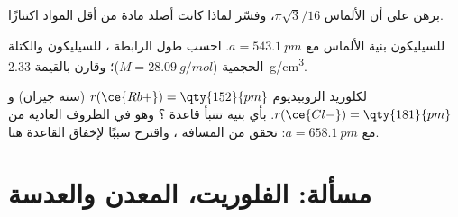 \begin{exercise}[$\star\star\star$]\label{exo:b1:crystals-ionic-covalent:10}
برهن على أن  الألماس $\pi\sqrt3/16$، وفسّر لماذا كانت
أصلد مادة من أقل المواد اكتنازًا.
\end{exercise}

\begin{exercise}[$\star\star\star$]\label{exo:b1:crystals-ionic-covalent:11}
للسيليكون بنية الألماس مع $a = \qty{543.1}{pm}$. احسب
طول الرابطة ،  للسيليكون
والكتلة الحجمية ($M = \qty{28.09}{g/mol}$)؛ وقارن بالقيمة \qty{2.33}{g/cm^3}.
\end{exercise}

\begin{exercise}[$\star\star\star$]\label{exo:b1:crystals-ionic-covalent:12}
لكلوريد الروبيديوم $r(\ce{Rb+}) = \qty{152}{pm}$ (ستة جيران)
و$r(\ce{Cl-}) = \qty{181}{pm}$. بأي بنية تتنبأ قاعدة ؟ وهو في الظروف العادية من  مع
$a = \qty{658.1}{pm}$: تحقق من المسافة ، واقترح سببًا
لإخفاق القاعدة هنا.
\end{exercise}

\section{مسألة: الفلوريت، المعدن والعدسة}

